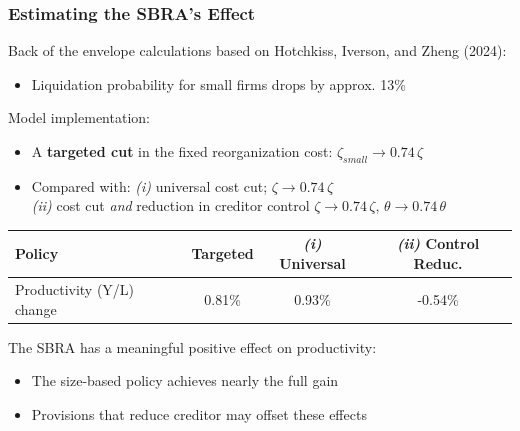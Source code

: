 \documentclass[aspectratio=169,xcolor=table]{beamer}
\begin{document}
\begin{frame}[label=sbra_effect] \frametitle{Estimating the SBRA’s Effect}

Back of the envelope calculations based on Hotchkiss, Iverson, and Zheng (2024): 
\begin{itemize} \small
    \item Liquidation probability for small firms drops by approx. 13\%  \hfill \hyperlink{sbra_data}{} 
\end{itemize} \normalsize

Model implementation:
\begin{itemize}\small
    \item A \textbf{targeted cut} in the fixed reorganization cost: \hspace{1.76cm} $\zeta_{small} \rightarrow 0.74\,\zeta$
    \item Compared with: \textit{(i)} universal cost cut; \hspace{3.3cm} $\zeta \rightarrow 0.74\,\zeta$ \\
    \hspace{2.3cm} \textit{(ii)} cost cut \textit{and} reduction in creditor control  $\zeta \rightarrow 0.74\,\zeta$,   $\theta \rightarrow 0.74\,\theta$  
\end{itemize} \vspace{2mm}

\pause

\small
\begin{table}[H]
    \centering
    \renewcommand{\arraystretch}{0.9}
    \begin{tabular}{lccc}
    \textbf{Policy} &  \textbf{Targeted} & \textit{(i)} \textbf{Universal} & \textit{(ii)} \textbf{Control Reduc.} \\    
    \toprule
    Productivity (Y/L) change & 0.81\%  & 0.93\% & -0.54\%  \\  
    \end{tabular}
    \label{tab:sbra_effect}
\end{table} \normalsize \vspace{2mm}

The SBRA has a meaningful positive effect on productivity: \hfill \hyperlink{sbra_fullres}{} 
\begin{itemize} \small
    \item The size-based policy achieves nearly the full gain
    \item Provisions that reduce creditor may offset these effects
\end{itemize}

\end{frame}
\end{document}
